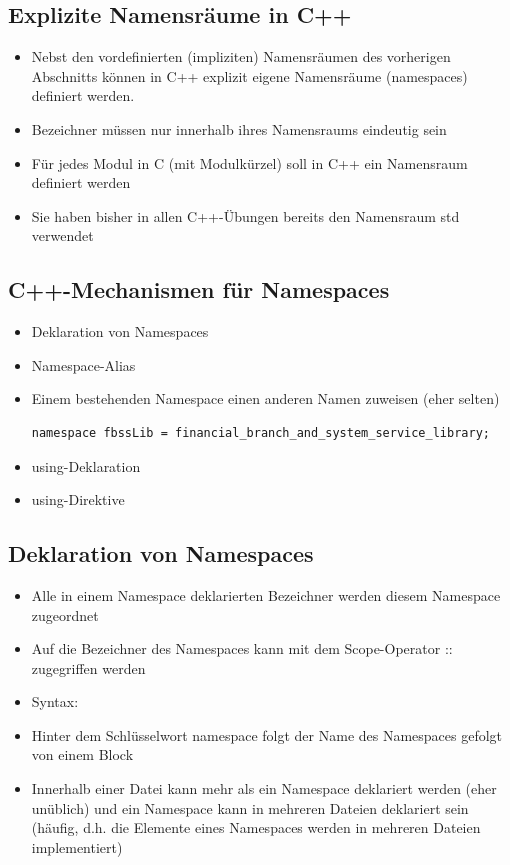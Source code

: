 \subsection{Explizite Namensräume in C++}
\label{sec:Explizite Namensraeume in C++}
\begin{itemize}
	\item Nebst den vordefinierten (impliziten) Namensräumen des vorherigen Abschnitts können in C++ explizit eigene Namensräume (namespaces) definiert werden.
	\item Bezeichner müssen nur innerhalb ihres Namensraums eindeutig sein
	\item Für jedes Modul in C (mit Modulkürzel) soll in C++ ein Namensraum definiert werden
	\item Sie haben bisher in allen C++-Übungen bereits den Namensraum std verwendet
\end{itemize}

\subsection{C++-Mechanismen für Namespaces}
\label{sec:C++-Mechanismen fuer Namespaces}
\begin{itemize}
	\item Deklaration von Namespaces
	\item Namespace-Alias
	\item[\-] Einem bestehenden Namespace einen anderen Namen zuweisen (eher selten)
\noindent
\begin{minipage}{\linewidth}
\begin{lstlisting}
namespace fbssLib = financial_branch_and_system_service_library;
\end{lstlisting}
\end{minipage}
	\item using-Deklaration
	\item using-Direktive
\end{itemize}

\subsection{Deklaration von Namespaces}
\label{sec:Deklaration von Namespaces}
\begin{itemize}
	\item Alle in einem Namespace deklarierten Bezeichner werden diesem Namespace zugeordnet
	\item Auf die Bezeichner des Namespaces kann mit dem Scope-Operator :: zugegriffen werden
	\item Syntax:
	\item[\-] Hinter dem Schlüsselwort namespace folgt der Name des Namespaces gefolgt von einem Block
	\item Innerhalb einer Datei kann mehr als ein Namespace deklariert werden (eher unüblich) und ein Namespace kann in mehreren Dateien deklariert sein (häufig, d.h. die Elemente eines Namespaces werden in mehreren Dateien implementiert)
\end{itemize}

